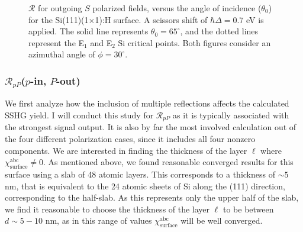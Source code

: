 \begin{figure}[H]
\centering
{}\hfill
{}
\caption{$\mathcal{R}$ for outgoing $S$ polarized fields, versus the angle of
incidence ($\theta_{0}$) for the Si(111)(1$\times$1):H surface. A scissors shift
of $\hbar\Delta = 0.7$ eV is applied. The solid line represents $\theta_{0} =
65^{\circ}$, and the dotted lines represent the E$_{1}$ and E$_{2}$ Si critical
points. Both figures consider an azimuthal angle of $\phi = 30^{\circ}$.}
\label{fig:1x1rS3d}
\end{figure}



\subsubsection{\texorpdfstring{$\mathcal{R}_{pP}$}{RpP}($p$-in, $P$-out)}
\label{sec:1x1RpP}

We first analyze how the inclusion of multiple reflections affects the
calculated SSHG yield. I will conduct this study for $\mathcal{R}_{pP}$ as it is
typically associated with the strongest signal output. It is also by far the
most involved calculation out of the four different polarization cases, since it
includes all four nonzero components. We are interested in finding the thickness
of the layer $\ell$ where $\chi^{\mathrm{abc}}_{\mathrm{surface}} \ne 0$. As
mentioned above, we found reasonable converged results for this surface using a
slab of 48 atomic layers. This corresponds to a thickness of $\sim 5$ nm, that
is equivalent to the 24 atomic sheets of Si along the (111) direction,
corresponding to the half-slab. As this represents only the upper half of the
slab, we find it reasonable to choose the thickness of the layer $\ell$ to be
between $d\sim 5-10$ nm, as in this range of values
$\chi^{\mathrm{abc}}_{\mathrm{surface}}$ will be well converged.

